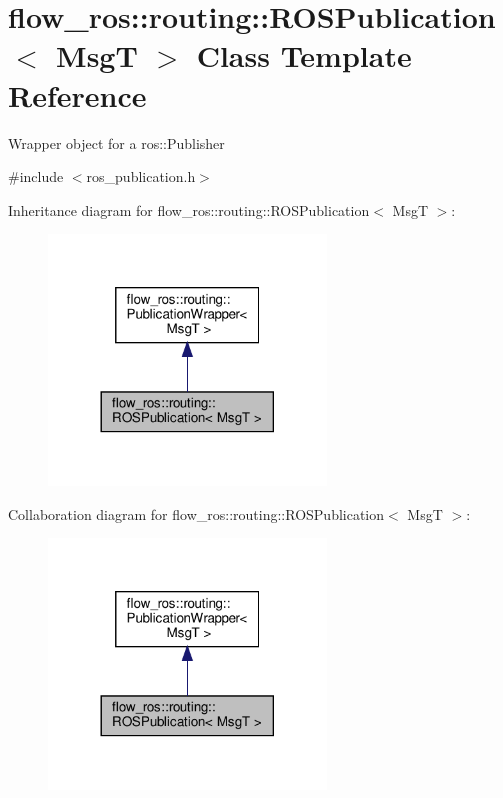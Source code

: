 \hypertarget{classflow__ros_1_1routing_1_1_r_o_s_publication}{}\section{flow\+\_\+ros\+:\+:routing\+:\+:R\+O\+S\+Publication$<$ MsgT $>$ Class Template Reference}
\label{classflow__ros_1_1routing_1_1_r_o_s_publication}


Wrapper object for a {\ttfamily ros\+::\+Publisher}  




{\ttfamily \#include $<$ros\+\_\+publication.\+h$>$}



Inheritance diagram for flow\+\_\+ros\+:\+:routing\+:\+:R\+O\+S\+Publication$<$ MsgT $>$\+:\nopagebreak
\begin{figure}[H]
\begin{center}
\leavevmode
\includegraphics[width=209pt]{classflow__ros_1_1routing_1_1_r_o_s_publication__inherit__graph}
\end{center}
\end{figure}


Collaboration diagram for flow\+\_\+ros\+:\+:routing\+:\+:R\+O\+S\+Publication$<$ MsgT $>$\+:\nopagebreak
\begin{figure}[H]
\begin{center}
\leavevmode
\includegraphics[width=209pt]{classflow__ros_1_1routing_1_1_r_o_s_publication__coll__graph}
\end{center}
\end{figure}
